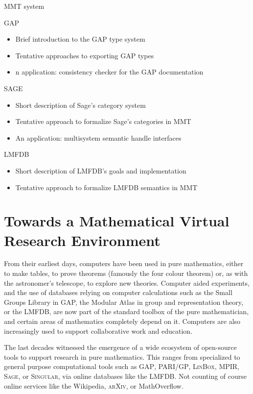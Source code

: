 \documentclass{llncs}
\newcommand{\software}[1]{\textsc{#1}\xspace}
\newcommand{\GAP}{\software{GAP}}
\newcommand{\Singular}{\software{Singular}}
\newcommand{\Sage}{\software{Sage}}
\newcommand{\PariGP}{\software{PARI/GP}}
\newcommand{\Linbox}{\software{LinBox}}
\newcommand{\LMFDB}{\software{LMFDB}}
\newcommand{\MPIR}{\software{MPIR}}
\newcommand{\Arxiv}{\software{arXiv}}
\begin{document}
\begin{description}
\item{MMT system}
\item{GAP} 
\begin{itemize}
\item Brief introduction to the GAP type system 
\item Tentative approaches to exporting GAP types 
\item n application: consistency checker for the GAP documentation
\end{itemize}
\item{SAGE} 
\begin{itemize}
\item Short description of Sage's category system 
\item Tentative approach to formalize Sage's categories in MMT 
\item An application: multisystem semantic handle interfaces
\end{itemize}
\item{LMFDB}
\begin{itemize}
\item Short description of LMFDB's goals and implementation 
\item Tentative approach to formalize LMFDB semantics in MMT
\end{itemize}
\end{description}


\section{Towards a Mathematical Virtual Research Environment}

From their earliest days, computers have been used in pure
mathematics, either to make tables, to prove theorems (famously the
four colour theorem) or, as with the astronomer's telescope, to
explore new theories. Computer aided experiments, and the use of
databases relying on computer calculations such as the Small Groups
Library in GAP, the Modular Atlas in group and representation theory,
or the LMFDB, are now part of the standard toolbox of the pure
mathematician, and certain areas of mathematics completely depend on
it. Computers are also increasingly used to support collaborative work
and education.

The last decades witnessed the emergence of a wide ecosystem of
open-source tools to support research in pure mathematics. This ranges
from specialized to general purpose computational tools such as \GAP,
\PariGP, \Linbox, \MPIR, \Sage, or \Singular, via online databases
like the \LMFDB. Not counting of course online services like the
Wikipedia, \Arxiv, or MathOverflow.
\end{document}
